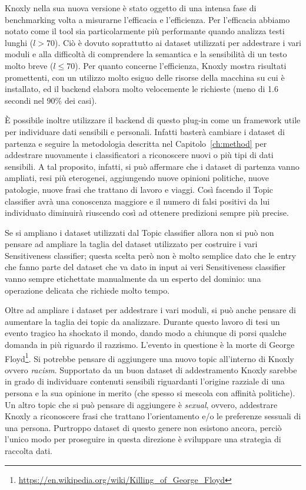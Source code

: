 Knoxly nella sua nuova versione è stato oggetto di una intensa fase di benchmarking volta a misurarne l'efficacia e l'efficienza. Per l'efficacia abbiamo notato come il tool sia particolarmente più performante quando analizza testi lunghi ($l>70$). Ciò è dovuto soprattutto ai dataset utilizzati per addestrare i vari moduli e alla difficoltà di comprendere la semantica e la sensibilità di un testo molto breve ($l \leq 70$). Per quanto concerne l'efficienza, Knoxly mostra risultati promettenti, con un utilizzo molto esiguo delle risorse della macchina su cui è installato, ed il backend elabora molto velocemente le richieste (meno di 1.6 secondi nel 90\% dei casi).

È possibile inoltre utilizzare il backend di questo plug-in come un framework utile per individuare dati sensibili e personali. Infatti basterà cambiare i dataset di partenza e seguire la metodologia descritta nel Capitolo~\ref{ch:method} per addestrare nuovamente i classificatori a riconoscere nuovi o più tipi di dati sensibili. A tal proposito, infatti, si può affermare che i dataset di partenza vanno ampliati, resi più eterogenei, aggiungendo nuove opinioni politiche, nuove patologie, nuove frasi che trattano di lavoro e viaggi. Così facendo il Topic classifier avrà una conoscenza maggiore e il numero di falsi positivi da lui individuato diminuirà riuscendo così ad ottenere predizioni sempre più precise.

Se si ampliano i dataset utilizzati dal Topic classifier allora non si può non pensare ad ampliare la taglia del dataset utilizzato per costruire i vari Sensitiveness classifier; questa scelta però non è molto semplice dato che le entry che fanno parte del dataset che va dato in input ai veri Sensitiveness classifier vanno sempre etichettate manualmente da un esperto del dominio: una operazione delicata che richiede molto tempo.

Oltre ad ampliare i dataset per addestrare i vari moduli, si può anche pensare di aumentare la taglia dei topic da analizzare. Durante questo lavoro di tesi un evento tragico ha shockato il mondo, dando modo a chiunque di porsi qualche domanda in più riguardo il razzismo. L'evento in questione è la morte di George Floyd\footnote{\url{https://en.wikipedia.org/wiki/Killing_of_George_Floyd}}. Si potrebbe pensare di aggiungere una nuovo topic all'interno di Knoxly ovvero \textit{racism}. Supportato da un buon dataset di addestramento Knoxly sarebbe in grado di individuare contenuti sensibili riguardanti l'origine razziale di una persona e la sua opinione in merito (che spesso si mescola con affinità politiche). Un altro topic che si può pensare di aggiungere è \textit{sexual}, ovvero, addestrare Knoxly a riconoscere frasi che trattano l'orientamento e/o le preferenze sessuali di una persona. Purtroppo dataset di questo genere non esistono ancora, perciò l'unico modo per proseguire in questa direzione è sviluppare una strategia di raccolta dati.

